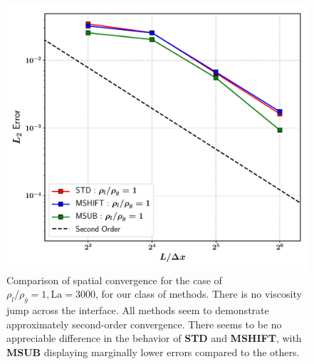 \begin{figure}[h!]
    \centering
    \includegraphics[width = 1.0\textwidth]{plots/capwave/conv_r1.pdf}
	\caption{Comparison of spatial convergence for the case of $\rho_l/\rho_g = 1 , \textrm{La} = 3000$, for our class of methods. There is no viscosity jump across the interface. All methods seem to demonstrate approximately second-order convergence. There seems to be no appreciable difference in the behavior of \textbf{STD} and \textbf{MSHIFT}, with \textbf{MSUB} displaying marginally lower errors compared to the others. }
    \label{conv_r1}
\end{figure}


